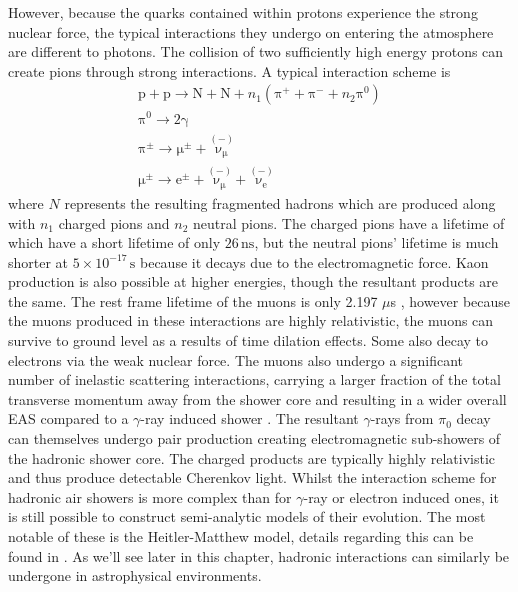 However, because the quarks contained within protons experience the strong nuclear force, the typical interactions they undergo on entering the atmosphere are different to photons. The collision of two sufficiently high energy protons can create pions through strong interactions.  A typical interaction scheme \cite{EAS} is
\begin{gather*}
\mathrm{p}+\mathrm{p}\rightarrow \mathrm{N}+\mathrm{N}+n_1 (\mathrm{\pi^+ + \pi^- }+n_2\mathrm{\pi^0}) \\
\mathrm{\pi^0} \rightarrow \mathrm{2\gamma} \\
\mathrm{\mathrm{\pi^{\pm}}} \rightarrow \mathrm{\mu^{\pm}}+\mathrm{\overset{(-)}{\nu_{\mu}}}\\
\mathrm{\mu^{\pm}} \rightarrow \mathrm{e^{\pm}}+\mathrm{\overset{(-)}{\nu_{\mu}}}+\mathrm{\overset{(-)}{\nu_{e}}}
\end{gather*}
where $N$ represents the resulting fragmented hadrons which are produced along with $n_1$ charged pions and $n_2$ neutral pions. The charged pions have a lifetime of which have a short lifetime of only $\mathrm{26\,ns}$, but the neutral pions' lifetime is much shorter at $5 \times 10^{-17}\,\mathrm{s}$ because it decays due to the electromagnetic force. Kaon production is also possible at higher energies, though the resultant products are the same. The rest frame lifetime of the muons is only 2.197 $\mu$s \cite{pdg}, however because the muons produced in these interactions are highly relativistic, the muons can survive to ground level as a results of time dilation effects. Some also decay to electrons via the weak nuclear force. The muons also undergo a significant number of inelastic scattering interactions, carrying a larger fraction of the total transverse momentum away from the shower core and resulting in a wider overall EAS compared to a $\gamma$-ray induced shower \cite{tomthesis}.  The resultant $\gamma$-rays from $\pi_0$ decay can themselves undergo pair production creating electromagnetic sub-showers of the hadronic shower core. The charged products are typically highly relativistic and thus produce detectable Cherenkov light.  Whilst the interaction scheme for hadronic air showers is more complex than for $\gamma$-ray or electron induced ones, it is still possible to construct semi-analytic models of their evolution. The most notable of these is the Heitler-Matthew model, details regarding this can be found in \cite{heitler}. As we'll see later in this chapter, hadronic interactions can similarly be undergone in astrophysical environments.
